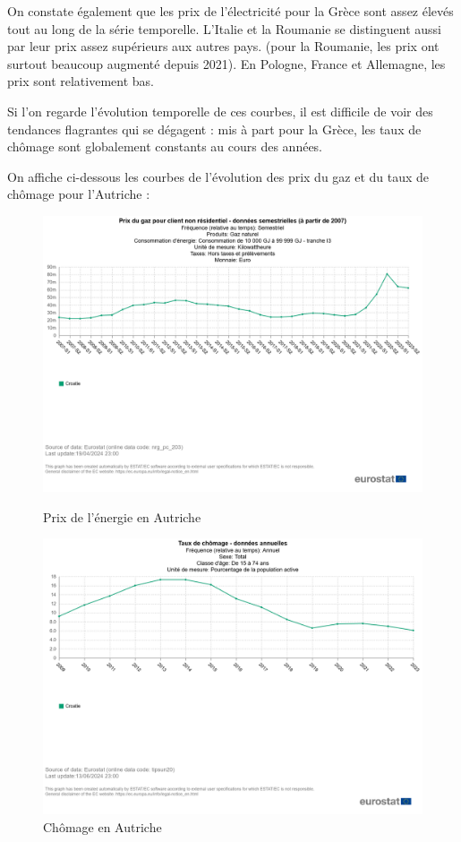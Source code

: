 \documentclass{article}
\begin{document}
On constate également que les prix de l'électricité pour la Grèce sont assez élevés tout au long de la série temporelle. L'Italie et la Roumanie se distinguent aussi par leur prix assez supérieurs aux autres pays. (pour la Roumanie, les prix ont surtout beaucoup augmenté depuis 2021). En Pologne, France et Allemagne, les prix sont relativement bas.

Si l'on regarde l'évolution temporelle de ces courbes, il est difficile de voir des tendances flagrantes qui se dégagent : mis à part pour la Grèce, les taux de chômage sont globalement constants au cours des années.

On affiche ci-dessous les courbes de l'évolution des prix du gaz et du taux de chômage pour l'Autriche :
\begin{figure}[H]
  \centering
  \begin{minipage}{0.45\textwidth}
      \centering
      \includegraphics[width=\textwidth]{"autriche_1.png"}
      \caption{Prix de l'énergie en Autriche}
  \end{minipage}\hfill
  \centering
  \begin{minipage}{0.45\textwidth}
      \centering
      \includegraphics[width=\textwidth]{"autriche_2.png"}
      \caption{Chômage en Autriche}
  \end{minipage}
\end{figure}
\end{document}
